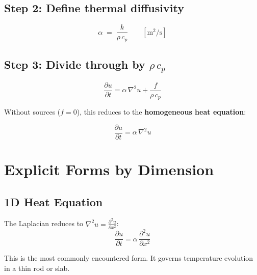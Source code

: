 \documentclass[11pt]{article}
\newcommand{\pd}[2]{\frac{\partial #1}{\partial #2}}
\newcommand{\pdd}[2]{\frac{\partial^2 #1}{\partial #2^2}}
\begin{document}
\subsection{Step 2: Define thermal diffusivity}

\begin{equation}
  \boxed{\alpha \;=\; \frac{k}{\rho\, c_p}}
  \qquad [\text{m}^2/\text{s}]
  \label{eq:alpha}
\end{equation}

\subsection{Step 3: Divide through by $\rho\,c_p$}

\begin{tcolorbox}[colback=red!5, colframe=red!50!black, title=The Heat Equation (General Form)]
\begin{equation}
  \boxed{\pd{u}{t} = \alpha\,\nabla^2 u + \frac{f}{\rho\, c_p}}
  \label{eq:heat_general}
\end{equation}
\end{tcolorbox}

\noindent
Without sources ($f = 0$), this reduces to the \textbf{homogeneous heat equation}:

\begin{tcolorbox}[colback=red!5, colframe=red!50!black, title=The Heat Equation (Homogeneous)]
\begin{equation}
  \boxed{\pd{u}{t} = \alpha\,\nabla^2 u}
  \label{eq:heat_homogeneous}
\end{equation}
\end{tcolorbox}

\section{Explicit Forms by Dimension}

\subsection{1D Heat Equation}

The Laplacian reduces to $\nabla^2 u = \pdd{u}{x}$:
\begin{equation}
  \boxed{\pd{u}{t} = \alpha\,\pdd{u}{x}}
  \label{eq:heat_1d}
\end{equation}

This is the most commonly encountered form. It governs temperature evolution in a thin rod or slab.
\end{document}
